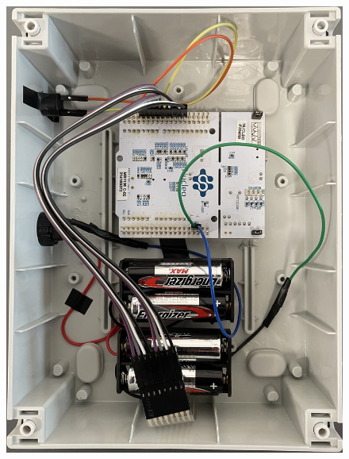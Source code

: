 \documentclass[a4paper]{article}
\begin{document}
\begin{figure}[h!t]
    \begin{center}
        \includegraphics[scale=0.2]{./figures/end1.jpg}

\end{center}
\end{figure}
\end{document}
